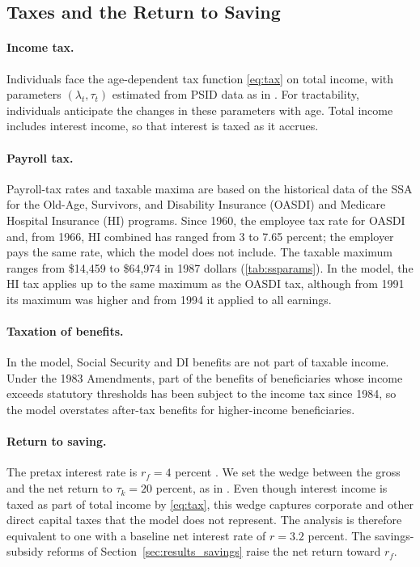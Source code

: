 \subsection{Taxes and the Return to Saving}\label{app:model_taxes}

\paragraph{Income tax.} Individuals face the age-dependent tax function \eqref{eq:tax} on total income, with parameters $(\lambda_t,\tau_t)$ estimated from PSID data as in \citet{Borella2023}. For tractability, individuals anticipate the changes in these parameters with age. Total income includes interest income, so that interest is taxed as it accrues.

\paragraph{Payroll tax.} Payroll-tax rates and taxable maxima are based on the historical data of the SSA for the Old-Age, Survivors, and Disability Insurance (OASDI) and Medicare Hospital Insurance (HI) programs. Since 1960, the employee tax rate for OASDI and, from 1966, HI combined has ranged from 3 to 7.65 percent; the employer pays the same rate, which the model does not include. %
 The taxable maximum ranges from \$14,459 to \$64,974 in 1987 dollars (\autoref{tab:ssparams}). In the model, the HI tax applies up to the same maximum as the OASDI tax, although from 1991 its maximum was higher and from 1994 it applied to all earnings.

\paragraph{Taxation of benefits.} In the model, Social Security and DI benefits are not part of taxable income. Under the 1983 Amendments, part of the benefits of beneficiaries whose income exceeds statutory thresholds has been subject to the income tax since 1984, so the model overstates after-tax benefits for higher-income beneficiaries.

\paragraph{Return to saving.} The pretax interest rate is $r_f=4$ percent \citep{french2005effects}. We set the wedge between the gross and the net return to $\tau_k=20$ percent, as in \citet{Stantcheva2017}. Even though interest income is taxed as part of total income by \eqref{eq:tax}, this wedge captures corporate and other direct capital taxes that the model does not represent. The analysis is therefore equivalent to one with a baseline net interest rate of $r=3.2$ percent. The savings-subsidy reforms of Section~\ref{sec:results_savings} raise the net return toward $r_f$.

